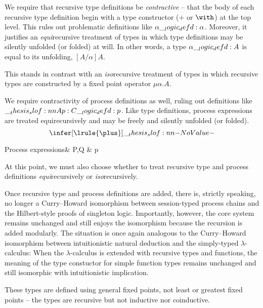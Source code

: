 We require that recursive type definitions be \emph{contractive}\autocite{Gay+Hole:AI05} -- that the body of each recursive type definition begin with a type constructor ($\plus$ or $\with$) at the top level.
This rules out problematic definitions like $\alpha \__logic_defd: \alpha$.
Moreover, it justifies an \emph{equi}\-recursive treatment of types in which type definitions may be silently unfolded (or folded) at will.
In other words, a type $\alpha \__logic_defd: A$ is equal to its unfolding, $[A/\alpha]A$.

This stands in contrast with an \emph{iso}\-recursive treatment of types in which recursive types are constructed by a fixed point operator $\mu \alpha.A$.


We require contractivity of process definitions as well, ruling out definitions like $\slof{A |- p : C} \defd p$.
Like type definitions, process expressions are treated equi\-recursively and may be freely and silently unfolded (or folded).
\begin{equation*}
  \infer[\lrule{\plus}]{\slof{}}{}
\end{equation*}

\begin{syntax*}
  Process expressions&
    P,Q & \dotsb \mid p
\end{syntax*}


At this point, we must also choose whether to treat recursive type and process definitions \emph{equi}\-recursively or \emph{iso}\-recursively.


Once recursive type and process definitions are added, there is, strictly speaking, no longer a Curry--Howard isomorphism between session-typed process chains and the Hilbert-style proofs of singleton logic.
Importantly, however, the core system remains unchanged and still enjoys the isomorphism because the recursion is added modularly.
The situation is once again analogous to the Curry--Howard isomorphism between intuitionistic natural deduction and the simply-typed $\lambda$-calculus:
When the $\lambda$-calculus is extended with recursive types and functions, the meaning of the type constuctor for simple function types remains unchanged and still isomorphic with intuitionistic implication.

These types are defined using general fixed points, not least or greatest fixed points -- the types are recursive but not inductive nor coinductive.



